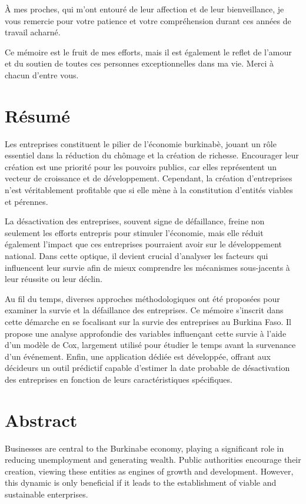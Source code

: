 \documentclass[a4paper,12pt]{report}
\begin{document}
À mes proches, qui m'ont entouré de leur affection et de leur bienveillance, je vous remercie pour votre patience et votre compréhension durant ces années de travail acharné.

Ce mémoire est le fruit de mes efforts, mais il est également le reflet de l'amour et du soutien de toutes ces personnes exceptionnelles dans ma vie. Merci à chacun d'entre vous.
\chapter*{Résumé}
Les entreprises constituent le pilier de l'économie burkinabè, jouant un rôle essentiel dans la réduction du chômage et la création de richesse. Encourager leur création est une priorité pour les pouvoirs publics, car elles représentent un vecteur de croissance et de développement. Cependant, la création d'entreprises n'est véritablement profitable que si elle mène à la constitution d'entités viables et pérennes.

La désactivation des entreprises, souvent signe de défaillance, freine non seulement les efforts entrepris pour stimuler l'économie, mais elle réduit également l'impact que ces entreprises pourraient avoir sur le développement national. Dans cette optique, il devient crucial d'analyser les facteurs qui influencent leur survie afin de mieux comprendre les mécanismes sous-jacents à leur réussite ou leur déclin.

Au fil du temps, diverses approches méthodologiques ont été proposées pour examiner la survie et la défaillance des entreprises. Ce mémoire s’inscrit dans cette démarche en se focalisant sur la survie des entreprises au Burkina Faso. Il propose une analyse approfondie des variables influençant cette survie à l’aide d’un modèle de Cox, largement utilisé pour étudier le temps avant la survenance d'un événement. Enfin, une application dédiée est développée, offrant aux décideurs un outil prédictif capable d'estimer la date probable de désactivation des entreprises en fonction de leurs caractéristiques spécifiques.
\chapter*{Abstract}
Businesses are central to the Burkinabe economy, playing a significant role in reducing unemployment and generating wealth. Public authorities encourage their creation, viewing these entities as engines of growth and development. However, this dynamic is only beneficial if it leads to the establishment of viable and sustainable enterprises.
\end{document}
